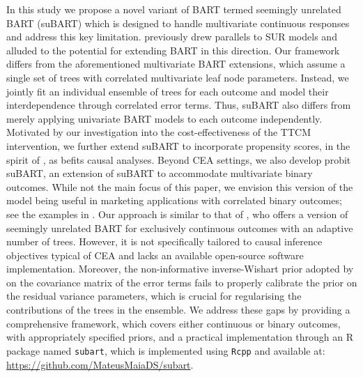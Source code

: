 \documentclass[aoas,preprint]{imsart}
\theoremstyle{plain}
\theoremstyle{definition}
\theoremstyle{remark}
\begin{document}
In this study we propose a novel variant of BART termed seemingly unrelated BART (suBART) which is designed to handle multivariate continuous responses and address this key limitation. \citet{chipman2010bart} previously drew parallels to SUR models \citep{zellner1962efficient} and alluded to the potential for extending BART in this direction. Our framework differs from the aforementioned multivariate BART extensions, which assume a single set of trees with correlated multivariate leaf node parameters. Instead, we jointly fit an individual ensemble of trees for each outcome and model their interdependence through correlated error terms. Thus, suBART also differs from merely applying univariate BART models to each outcome independently. Motivated by our investigation into the cost-effectiveness of the TTCM intervention, we further extend suBART to incorporate propensity scores, in the spirit of \citet{hahn2020bayesian}, as befits causal analyses. Beyond CEA settings, we also develop probit suBART, an extension of suBART to accommodate multivariate binary outcomes. While not the main focus of this paper, we envision this version of the model being useful in marketing applications with correlated binary outcomes; see the examples in \citet{rossi2005bayesian}. Our approach is similar to that of \citet{chakraborty2016bayesian}, who offers a version of seemingly unrelated BART for exclusively continuous outcomes with an adaptive number of trees. However, it is not specifically tailored to causal inference objectives typical of CEA and lacks an available open-source software implementation. Moreover, the non-informative inverse-Wishart prior adopted by \citet{chakraborty2016bayesian} on the covariance matrix of the error terms fails to properly calibrate the prior on the residual variance parameters, which is crucial for regularising the contributions of the trees in the ensemble. We address these gaps by providing a comprehensive framework, which covers either continuous or binary outcomes, with appropriately specified priors, and a practical implementation through an \textsf{R} package named \texttt{subart}, which is implemented using \texttt{Rcpp} and available at: \url{https://github.com/MateusMaiaDS/subart}.
\end{document}
